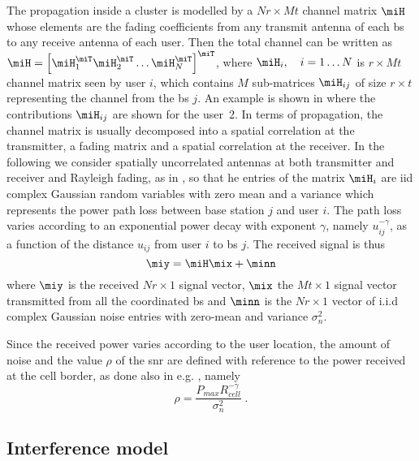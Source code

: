 The propagation inside a cluster is modelled by a $Nr\times Mt$
channel matrix $\miH$ whose elements are the
fading coefficients from any transmit antenna of each \gls{bs} to any receive antenna
of each user. Then the total channel can be written as  
$\miH=\left[\miH_1^\miT\miH_2^\miT\dots\miH_N^\miT\right]^\miT$, where 
$\miH_i, \quad i=1\dots N$ is $r\times Mt$ channel matrix seen by user $i$, which contains $M$ sub-matrices $\miH_{ij}$ of size $r\times t$ representing the channel from the \gls{bs} $j$. An example is shown in  where the contributions $\miH_{ij}$ are shown for the user~2.
In terms of propagation, the channel matrix is usually decomposed into a spatial correlation at the transmitter, a fading matrix and a spatial correlation at the receiver.
In the following we consider spatially uncorrelated antennas at both transmitter and receiver and Rayleigh fading, as in \cite{karakayali06}, so that he entries of the matrix $\miH_i$ are iid complex Gaussian random variables with zero mean and a variance which represents the power path loss between base station $j$ and user $i$. 
The path loss varies according to an exponential power decay with exponent $\gamma$, namely $u_{ij}^{-\gamma}$, as a function of the distance $u_{ij}$ from user $i$ to \gls{bs} $j$. The received signal is thus
\begin{equation}
    \miy=\miH\mix+ \minn \label{eq:yHxn}
\end{equation}
where $\miy$ is the received $Nr\times 1$ signal vector, $\mix$ the $Mt\times 1$ signal vector transmitted from all the coordinated \gls{bs} and $\minn$ is the $Nr\times 1$ vector of i.i.d complex Gaussian noise entries
with zero-mean and variance $\sigma_n^2$.

Since the received power varies according to the user location, the amount of noise and the value $\rho$ of the \gls{snr} are defined with reference to the power received at the cell border, as done also in e.g. \cite{zhang09}, namely
\begin{equation}
    \rho = \frac{P_{max}R_{cell}^{-\gamma}}{\sigma_n^2}\;. \label{defSNR}
\end{equation}


\subsection{Interference model}\label{interference}

